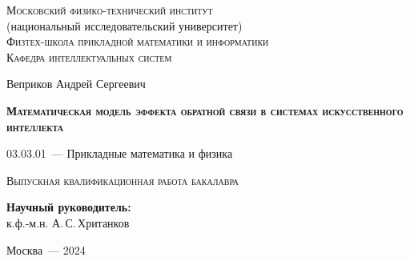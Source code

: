 \thispagestyle{empty}

\begin{titlepage}
    \begin{center}
        \textsc{Московский физико-технический институт}\\
        (национальный исследовательский университет)\\
        \textsc{Физтех-школа прикладной математики и информатики}\\
        \textsc{Кафедра интеллектуальных систем}
        \end{center}
        \vspace{2.5cm}
        \begin{center}
        {Веприков Андрей Сергеевич}
        \par
        \vspace{2cm}
        {\Large \textsc{\textbf{Математическая модель эффекта обратной связи в системах искусственного интеллекта}}}
        \par
        \vspace{2cm}
        {03.03.01~--- Прикладные математика и физика}
        \par
        \vspace{2cm}
        \textsc{Выпускная квалификационная работа бакалавра}
        \end{center}
        \vspace{2cm}
        \hfill\parbox{8,4cm}{\textbf{Научный руководитель:}
        \\к.ф.-м.н. А.\,С.\,Хританков}
        \par
        \vspace{2.5cm}
        \begin{center}
        {Москва~--- 2024}
    \end{center}
\end{titlepage}